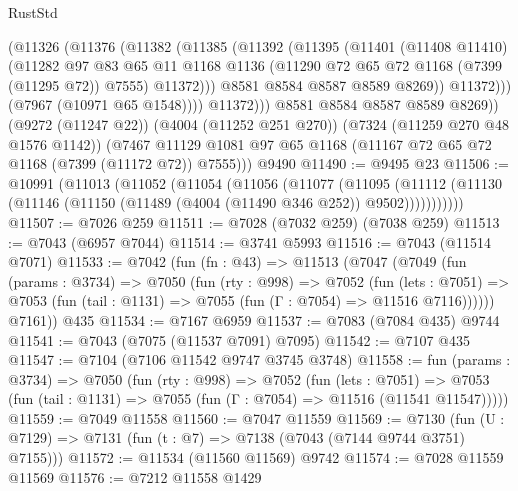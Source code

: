 \begin{lexlean}{RustStd}
\begin{coremodule}
                    (@11326
                      (@11376
                        (@11382
                          (@11385
                            (@11392
                              (@11395
                                (@11401
                                  (@11408 @11410)
                                  (@11282
                                    @97
                                    @83
                                    @65
                                    @11
                                    @1168
                                    @1136
                                    (@11290 @72 @65 @72 @1168 (@7399 (@11295 @72)) @7555)
                                    @11372)))
                              @8581
                              @8584
                              @8587
                              @8589
                              @8269))
                          @11372)))
                    (@7967 (@10971 @65 @1548))))
                @11372)))
          @8581
          @8584
          @8587
          @8589
          @8269))
      (@9272 (@11247 @22))
      (@4004 (@11252 @251 @270))
      (@7324 (@11259 @270 @48 @1576 @1142))
      (@7467 @11129 @1081 @97 @65 @1168 (@11167 @72 @65 @72 @1168 (@7399 (@11172 @72)) @7555)))
    @9490
@11490 := @9495 @23
@11506 := @10991
    (@11013
      (@11052
        (@11054
          (@11056
            (@11077
              (@11095
                (@11112 (@11130 (@11146 (@11150 (@11489 (@4004 (@11490 @346 @252)) @9502)))))))))))
@11507 := @7026 @259
@11511 := @7028 (@7032 @259) (@7038 @259)
@11513 := @7043 (@6957 @7044)
@11514 := @3741 @5993
@11516 := @7043 (@11514 @7071)
@11533 := @7042
    (fun (fn : @43) =>
    @11513
      (@7047
        (@7049
          (fun (params : @3734) =>
          @7050
            (fun (rty : @998) =>
            @7052
              (fun (lets : @7051) =>
              @7053 (fun (tail : @1131) => @7055 (fun (Γ : @7054) => @11516 @7116))))))
        @7161))
    @435
@11534 := @7167 @6959
@11537 := @7083 (@7084 @435) @9744
@11541 := @7043 (@7075 (@11537 @7091) @7095)
@11542 := @7107 @435
@11547 := @7104 (@7106 @11542 @9747 @3745 @3748)
@11558 := fun (params : @3734) =>
  @7050
    (fun (rty : @998) =>
    @7052
      (fun (lets : @7051) =>
      @7053 (fun (tail : @1131) => @7055 (fun (Γ : @7054) => @11516 (@11541 @11547)))))
@11559 := @7049 @11558
@11560 := @7047 @11559
@11569 := @7130 (fun (U : @7129) => @7131 (fun (t : @7) => @7138 (@7043 (@7144 @9744 @3751) @7155)))
@11572 := @11534 (@11560 @11569) @9742
@11574 := @7028 @11559 @11569
@11576 := @7212 @11558 @1429

\end{coremodule}
\end{lexlean}
